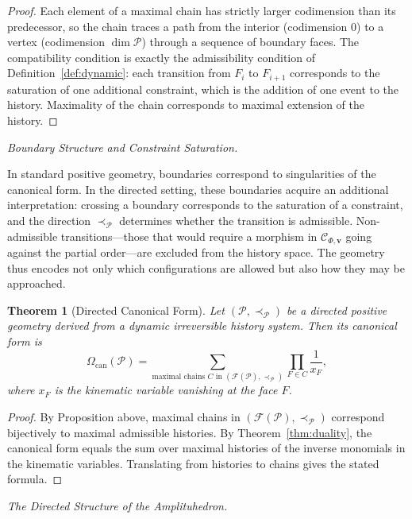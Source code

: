 \documentclass[11pt]{article}
\theoremstyle{plain}
\newtheorem{theorem}{Theorem}[section]
\theoremstyle{definition}
\theoremstyle{remark}
\newcommand{\CF}{\Omega_{\mathrm{can}}}
\newcommand{\Ccat}{\mathcal{C}_{\Phi,\mathbf{v}}}
\begin{document}
\begin{proof}
Each element of a maximal chain has strictly larger codimension than its predecessor, so the chain traces a path from the interior (codimension 0) to a vertex (codimension $\dim\mathcal{P}$) through a sequence of boundary faces. The compatibility condition is exactly the admissibility condition of Definition~\ref{def:dynamic}: each transition from $F_i$ to $F_{i+1}$ corresponds to the saturation of one additional constraint, which is the addition of one event to the history. Maximality of the chain corresponds to maximal extension of the history.
\end{proof}

\medskip\noindent\textit{Boundary Structure and Constraint Saturation.}

In standard positive geometry, boundaries correspond to singularities of the canonical form. In the directed setting, these boundaries acquire an additional interpretation: crossing a boundary corresponds to the saturation of a constraint, and the direction $\prec_{\mathcal{P}}$ determines whether the transition is admissible. Non-admissible transitions---those that would require a morphism in $\Ccat$ going against the partial order---are excluded from the history space. The geometry thus encodes not only which configurations are allowed but also how they may be approached.

\begin{theorem}[Directed Canonical Form]
\label{thm:directed-form}
Let $(\mathcal{P}, \prec_{\mathcal{P}})$ be a directed positive geometry derived from a dynamic irreversible history system. Then its canonical form is
\[
  \CF(\mathcal{P}) = \sum_{\text{maximal chains } C \text{ in } (\mathcal{F}(\mathcal{P}), \prec_{\mathcal{P}})} \prod_{F \in C} \frac{1}{x_F},
\]
where $x_F$ is the kinematic variable vanishing at the face $F$.
\end{theorem}

\begin{proof}
By Proposition above, maximal chains in $(\mathcal{F}(\mathcal{P}), \prec_{\mathcal{P}})$ correspond bijectively to maximal admissible histories. By Theorem~\ref{thm:duality}, the canonical form equals the sum over maximal histories of the inverse monomials in the kinematic variables. Translating from histories to chains gives the stated formula.
\end{proof}

\medskip\noindent\textit{The Directed Structure of the Amplituhedron.}
\end{document}
